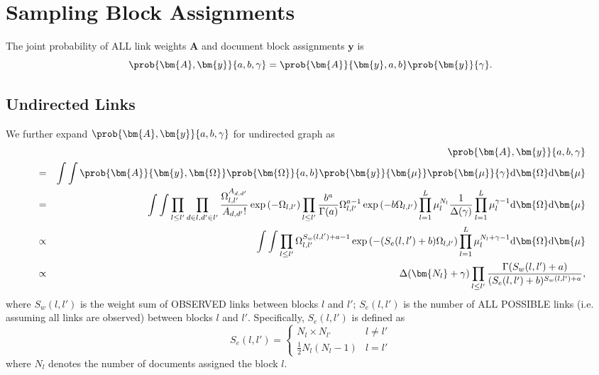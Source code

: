 \section{Sampling Block Assignments}
\label{sec:block}

The joint probability of ALL link weights $\bm{A}$ and document block assignments $\bm{y}$ is
\begin{equation}
\prob {\bm{A}, \bm{y}} {a, b, \gamma} = \prob {\bm{A}} {\bm{y}, a, b} \prob {\bm{y}} {\gamma}.
\end{equation}

\subsection{Undirected Links}
\label{ssec:undirected}

We further expand $\prob {\bm{A}, \bm{y}} {a, b, \gamma}$ for undirected graph as
\begin{eqnarray}
&&\prob {\bm{A}, \bm{y}} {a, b, \gamma} \\
&=& \int \int \prob {\bm{A}} {\bm{y}, \bm{\Omega}} \prob {\bm{\Omega}} {a, b} \prob {\bm{y}} {\bm{\mu}} \prob {\bm{\mu}} {\gamma} \mathrm{d} \bm{\Omega} \mathrm{d} \bm{\mu}\\
&=&\int \int \prod_{l\leq l'} \prod_{d\in l, d' \in l'} \frac {\Omega_{l,l'}^{A_{d,d'}}} {A_{d,d'}!} \exp \left( -\Omega_{l,l'} \right) \prod_{l\leq l'} \frac {b^a} {\Gamma(a)} \Omega_{l, l'}^{a-1} \exp \left( -b \Omega_{l,l'} \right) \prod_{l=1}^{L} \mu_l^{N_l} \frac {1} {\Delta(\gamma)} \prod_{l=1}^{L} \mu_l^{\gamma-1} \mathrm{d} \bm{\Omega} \mathrm{d} \bm{\mu}\\
&\propto&\int \int \prod_{l\leq l'} \Omega_{l,l'}^{S_w(l,l')+a-1} \exp \left( -(S_e(l,l')+b) \Omega_{l,l'} \right) \prod_{l=1}^{L} \mu_l^{N_l+\gamma-1} \mathrm{d} \bm{\Omega} \mathrm{d} \bm{\mu}\\
&\propto& \Delta(\bm{N_l}+\gamma)\prod_{l\leq l'} \frac {\Gamma(S_w(l,l')+a)} {(S_e(l,l')+b)^{S_w(l,l')+a}},
\end{eqnarray}
where $S_w(l,l')$ is the weight sum of OBSERVED links between blocks $l$ and $l'$; $S_e(l,l')$ is the number of ALL POSSIBLE links (i.e. assuming all links are observed) between blocks $l$ and $l'$. Specifically, $S_e(l,l')$ is defined as
\begin{equation}
S_e(l,l')=
\left\{
    \begin{array}{cc}
        N_l\times N_{l'} & l\neq l'\\
        \frac{1}{2} N_l (N_l-1) & l=l'
    \end{array}
\right.
\end{equation}
where $N_l$ denotes the number of documents assigned the block $l$.\\

